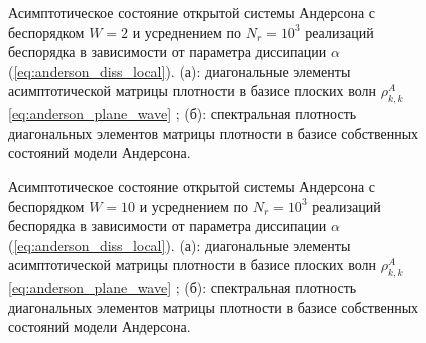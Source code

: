 \begin{figure}[h]
	\legend{}
	\caption[Этот текст попадает в названия рисунков в списке рисунков]
	{
		Асимптотическое состояние открытой системы Андерсона с беспорядком \(W=2\) и усреднением по \(N_r=10^3\) реализаций беспорядка в зависимости от параметра диссипации \(\alpha\) (\cref{eq:anderson_diss_local}). (а): диагональные элементы асимптотической матрицы плотности в базисе плоских волн \(\rho^A_{k,k}\) \cref{eq:anderson_plane_wave} ; (б): спектральная плотность диагональных элементов матрицы плотности в базисе собственных состояний модели Андерсона.
	}
	\label{fig:anderson_rho_kk_in_foutier_1}
\end{figure}
\begin{figure}[h]
	\legend{}
	\caption[Этот текст попадает в названия рисунков в списке рисунков]
	{
		Асимптотическое состояние открытой системы Андерсона с беспорядком \(W=10\) и усреднением по \(N_r=10^3\) реализаций беспорядка в зависимости от параметра диссипации \(\alpha\) (\cref{eq:anderson_diss_local}). (а): диагональные элементы асимптотической матрицы плотности в базисе плоских волн \(\rho^A_{k,k}\) \cref{eq:anderson_plane_wave} ; (б): спектральная плотность диагональных элементов матрицы плотности в базисе собственных состояний модели Андерсона.
	}
	\label{fig:anderson_rho_kk_in_foutier_2}
\end{figure}

